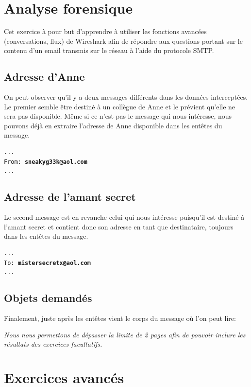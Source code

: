\documentclass[11pt,a4paper]{article}
\begin{document}
\section{Analyse forensique}

Cet exercice à pour but d'apprendre à utiliser les fonctions avancées (conversations, flux) de Wireshark afin de répondre aux questions portant sur le contenu d'un email transmis sur le réseau à l'aide du protocole SMTP.

\subsection{Adresse d'Anne}

On peut observer qu'il y a deux messages différents dans les données interceptées. Le premier semble être destiné à un collègue de Anne et le prévient qu'elle ne sera pas disponible. Même si ce n'est pas le message qui nous intéresse, nous pouvons déjà en extraire l'adresse de Anne disponible dans les entêtes du message.

\texttt{... \\ From: \textbf{sneakyg33k@aol.com} \\ ...}

\subsection{Adresse de l'amant secret}

Le second message est en revanche celui qui nous intéresse puisqu'il est destiné à l'amant secret et contient donc son adresse en tant que destinataire, toujours dans les entêtes du message.

\texttt{... \\ To: \textbf{mistersecretx@aol.com} \\ ...}

\subsection{Objets demandés}

Finalement, juste après les entêtes vient le corps du message où l'on peut lire:



\newpage

\emph{\footnotesize 
Nous nous permettons de dépasser la limite de 2 pages afin de pouvoir inclure les résultats des exercices facultatifs.
}

\section{Exercices avancés}
\end{document}
